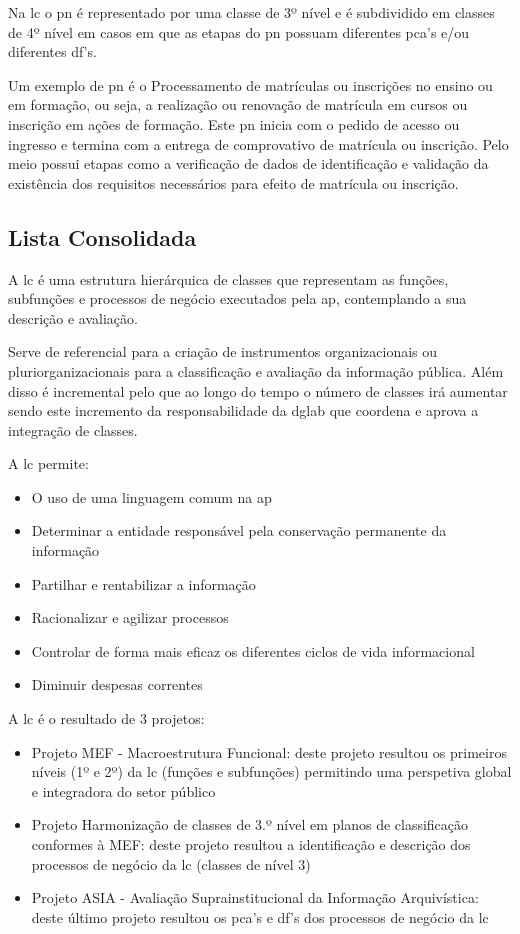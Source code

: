 Na \acrshort{lc} o \acrshort{pn} é representado por uma classe de 3º nível e é subdividido em classes de 4º nível em casos em que as etapas do \acrlong{pn} possuam diferentes \acrshort{pca}'s e/ou diferentes \acrshort{df}'s.

Um exemplo de \acrshort{pn} é o Processamento de matrículas ou inscrições no ensino ou em formação, ou seja, a realização ou renovação de matrícula em cursos ou inscrição em ações de formação. Este \acrshort{pn} inicia com o pedido de acesso ou ingresso e termina com a entrega de comprovativo de matrícula ou inscrição. Pelo meio possui etapas como a verificação de dados de identificação e validação da existência dos requisitos necessários para efeito de matrícula ou inscrição.

\subsection{Lista Consolidada}

A \acrfull{lc} é uma estrutura hierárquica de classes que representam as funções, subfunções e processos de negócio executados pela \acrfull{ap}, contemplando a sua descrição e avaliação.~\cite{lc}

Serve de referencial para a criação de instrumentos organizacionais ou pluriorganizacionais para a classificação e avaliação da informação pública. Além disso é incremental pelo que ao longo do tempo o número de classes irá aumentar sendo este incremento da responsabilidade da \acrshort{dglab} que coordena e aprova a integração de classes.

A \acrshort{lc} permite:~\cite{lc}
\begin{itemize}
    \item O uso de uma linguagem comum na \acrshort{ap}
    \item Determinar a entidade responsável pela conservação permanente da informação
    \item Partilhar e rentabilizar a informação
    \item Racionalizar e agilizar processos
    \item Controlar de forma mais eficaz os diferentes ciclos de vida informacional
    \item Diminuir despesas correntes
\end{itemize}

A \acrshort{lc} é o resultado de 3 projetos:
\begin{itemize}
    \item Projeto MEF - Macroestrutura Funcional: deste projeto resultou os primeiros níveis (1º e 2º) da \acrshort{lc} (funções e subfunções) permitindo uma perspetiva global e integradora do setor público
    \item Projeto Harmonização de classes de 3.º nível em planos de classificação conformes à MEF: deste projeto resultou a identificação e descrição dos processos de negócio da \acrshort{lc} (classes de nível 3)
    \item Projeto ASIA - Avaliação Suprainstitucional da Informação Arquivística: deste último projeto resultou os \acrshort{pca}'s e \acrshort{df}'s dos processos de negócio da \acrshort{lc} 
\end{itemize}

